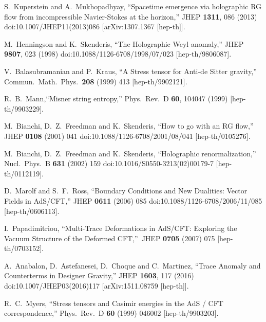 \documentclass[11pt,epsf,letterpaper]{article}%
\begin{document}
\begin{thebibliography}{99}
S.~Kuperstein and A.~Mukhopadhyay, ``Spacetime
emergence via holographic RG flow from incompressible Navier-Stokes at the
horizon,'' JHEP \textbf{1311}, 086 (2013) doi:10.1007/JHEP11(2013)086
[arXiv:1307.1367 [hep-th]].


M.~Henningson and K.~Skenderis, ``The Holographic
Weyl anomaly,'' JHEP \textbf{9807}, 023 (1998)
doi:10.1088/1126-6708/1998/07/023 [hep-th/9806087].


V.~Balasubramanian and P.~Kraus, ``A Stress
tensor for Anti-de Sitter gravity,'' Commun.\ Math.\ Phys.\ \textbf{208}
(1999) 413 [hep-th/9902121].

R.~B.~Mann,``Misner string entropy,'' Phys.\ Rev.\ D
\textbf{60}, 104047 (1999) [hep-th/9903229].

M.~Bianchi, D.~Z.~Freedman and K.~Skenderis, ``How to
go with an RG flow,'' JHEP \textbf{0108} (2001) 041
doi:10.1088/1126-6708/2001/08/041 [hep-th/0105276].

M.~Bianchi, D.~Z.~Freedman and K.~Skenderis,
``Holographic renormalization,'' Nucl.\ Phys.\ B \textbf{631} (2002) 159
doi:10.1016/S0550-3213(02)00179-7 [hep-th/0112119].

D.~Marolf and S.~F.~Ross, ``Boundary Conditions and
New Dualities: Vector Fields in AdS/CFT,'' JHEP \textbf{0611} (2006) 085
doi:10.1088/1126-6708/2006/11/085 [hep-th/0606113].


I.~Papadimitriou, \textquotedblleft Multi-Trace
Deformations in AdS/CFT: Exploring the Vacuum Structure of the Deformed
CFT,\textquotedblright\ JHEP \textbf{0705} (2007) 075 [hep-th/0703152].


A.~Anabalon, D.~Astefanesei, D.~Choque and
C.~Martinez, ``Trace Anomaly and Counterterms in Designer Gravity,'' JHEP
\textbf{1603}, 117 (2016) doi:10.1007/JHEP03(2016)117 [arXiv:1511.08759
[hep-th]].


R.~C.~Myers, ``Stress tensors and Casimir energies in
the AdS / CFT correspondence,'' Phys.\ Rev.\ D \textbf{60} (1999) 046002
[hep-th/9903203].



\end{thebibliography}
\end{document}
